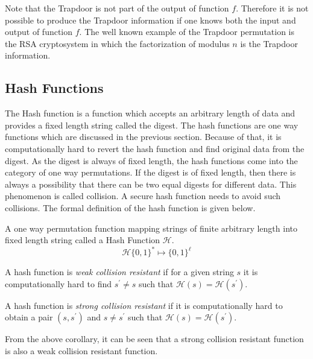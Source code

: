 Note that the Trapdoor is not part of the output of function $f$. Therefore it is not possible to produce the Trapdoor information if one knows both the input and output of function $f$. The well known example of the Trapdoor permutation is the RSA cryptosystem in which the factorization of modulus $n$ is the Trapdoor information.

\subsection{Hash Functions}
The Hash function is a function which accepts an arbitrary length of data and provides a fixed length string called the digest. The hash functions are one way functions which are discussed in the previous section. Because of that, it is computationally hard to revert the hash function and find original data from the digest. As the digest is always of fixed length, the hash functions come into the category of one way permutations. If the digest is of fixed length, then there is always a possibility that there can be two equal digests for different data. This phenomenon is called collision. A secure hash function needs to avoid such collisions. The formal definition of the hash function is given below.

\begin{definition} A one way permutation function mapping strings of finite arbitrary length into fixed length string called a Hash Function $\mathcal{H}$.
\[ \mathcal{H}\{0, 1\}^* \mapsto \{0, 1\}^\ell \] 
\end{definition}

\begin{corollary} A hash function is \emph{weak collision resistant} if for a given string $s$ it is computationally hard to find $s^\prime \neq s$ such that $\mathcal{H}(s) = \mathcal{H}(s^\prime)$\cite{naor1989universal}.\end{corollary}

\begin{corollary} A hash function is \emph{strong collision resistant} if it is computationally hard to obtain a pair $(s, s^\prime)$ and $s \neq  s^\prime$ such that $\mathcal{H}(s) = \mathcal{H}(s^\prime)$\cite{damgaard1987collision}.\end{corollary}

From the above corollary, it can be seen that a strong collision resistant function is also a weak collision resistant function.

